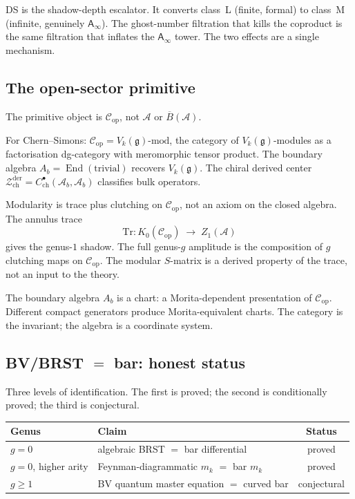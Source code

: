 \documentclass[11pt]{article}
\newcommand{\cA}{\mathcal{A}}
\newcommand{\cC}{\mathcal{C}}
\newcommand{\cZ}{\mathcal{Z}}
\newcommand{\fg}{\mathfrak{g}}
\newcommand{\barB}{\overline{B}}
\newcommand{\Ainf}{\mathsf{A}_{\infty}}
\newcommand{\End}{\operatorname{End}}
\newcommand{\Zder}{\cZ^{\mathrm{der}}_{\mathrm{ch}}}
\begin{document}
\medskip

DS is the shadow-depth escalator.  It converts class~L (finite,
formal) to class~M (infinite, genuinely $\Ainf$).  The
ghost-number filtration that kills the coproduct is the same
filtration that inflates the $\Ainf$ tower.  The two effects
are a single mechanism.


\subsection{The open-sector primitive}
\label{sec:open-sector-primitive-session}

The primitive object is $\cC_{\mathrm{op}}$, not $\cA$ or
$\barB(\cA)$.

For Chern--Simons: $\cC_{\mathrm{op}} = V_k(\fg)\text{-mod}$,
the category of $V_k(\fg)$-modules as a factorisation
dg-category with meromorphic tensor product.  The boundary
algebra $A_b = \End(\mathrm{trivial})$ recovers $V_k(\fg)$.
The chiral derived center $\Zder = C^\bullet_{\mathrm{ch}}(\cA_b,
\cA_b)$ classifies bulk operators.

Modularity is trace plus clutching on $\cC_{\mathrm{op}}$, not
an axiom on the closed algebra.  The annulus trace
\[
\mathrm{Tr}\colon K_0(\cC_{\mathrm{op}})
\;\longrightarrow\;
Z_1(\cA)
\]
gives the genus-$1$ shadow.  The full genus-$g$ amplitude is the
composition of $g$ clutching maps on $\cC_{\mathrm{op}}$.  The
modular $S$-matrix is a derived property of the trace, not an
input to the theory.

The boundary algebra $A_b$ is a chart: a Morita-dependent
presentation of $\cC_{\mathrm{op}}$.  Different compact
generators produce Morita-equivalent charts.  The category is
the invariant; the algebra is a coordinate system.


\subsection{BV/BRST $=$ bar: honest status}
\label{sec:bv-brst-bar-honest}

Three levels of identification.  The first is proved; the
second is conditionally proved; the third is conjectural.

\begin{center}
\small
\renewcommand{\arraystretch}{1.15}
\begin{tabular}{@{}llc@{}}
\textbf{Genus} & \textbf{Claim} & \textbf{Status} \\
\hline
$g = 0$ & algebraic BRST $=$ bar differential & proved \\[3pt]
$g = 0$, higher arity
  & Feynman-diagrammatic $m_k$ $=$ bar $m_k$
  & proved \\[3pt]
$g \geq 1$ & BV quantum master equation $=$ curved bar
  & conjectural
\end{tabular}
\end{center}
\end{document}
